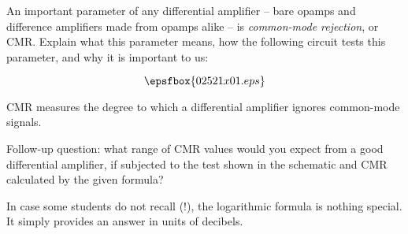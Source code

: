 

An important parameter of any differential amplifier -- bare opamps and difference amplifiers made from opamps alike -- is {\it common-mode rejection}, or CMR.  Explain what this parameter means, how the following circuit tests this parameter, and why it is important to us:

$$\epsfbox{02521x01.eps}$$







CMR measures the degree to which a differential amplifier ignores common-mode signals.

\vskip 10pt

Follow-up question: what range of CMR values would you expect from a good differential amplifier, if subjected to the test shown in the schematic and CMR calculated by the given formula?







In case some students do not recall (!), the logarithmic formula is nothing special.  It simply provides an answer in units of decibels.




